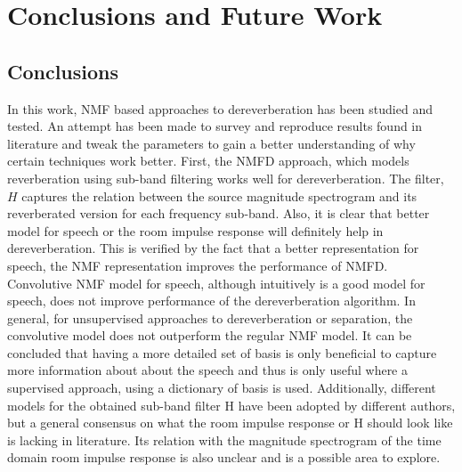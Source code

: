 \documentclass[12pt, a4paper, oneside]{book}
\begin{document}

\chapter{Conclusions and Future Work}  %

\ifpdf
    \graphicspath{{Chapter1/Figs/Raster/}{Chapter1/Figs/PDF/}{Chapter1/Figs/}}
\else
    \graphicspath{{Chapter1/Figs/Vector/}{Chapter1/Figs/}}
\fi


\section{Conclusions}
In this work, NMF based approaches to dereverberation has been studied and tested. An attempt has been made to survey and reproduce results found in literature and tweak the parameters to gain a better understanding of why certain techniques work better. 
First, the NMFD approach, which models reverberation using sub-band filtering works well for dereverberation. The filter, $H$ captures the relation between the source magnitude spectrogram and its reverberated version for each frequency sub-band. 
Also, it is clear that  better model for speech or the room impulse response will definitely help in dereverberation. This is verified by the fact that a better representation for speech, the NMF representation improves the performance of NMFD. 
Convolutive NMF model for speech, although intuitively is a good model for speech, does not improve performance of the dereverberation algorithm. In general, for unsupervised approaches to dereverberation or separation, the convolutive model does not outperform the regular NMF model. It can be concluded that having a more detailed set of basis is only beneficial to capture more information about about the speech and thus is only useful where a supervised approach, using a dictionary of basis is used.
Additionally, different models for the obtained sub-band filter H have been adopted by different authors, but a general consensus on what the room impulse response or H should look like is lacking in literature. Its relation with the magnitude spectrogram of the time domain room impulse response is also unclear and is a possible area to explore. 
\end{document}
